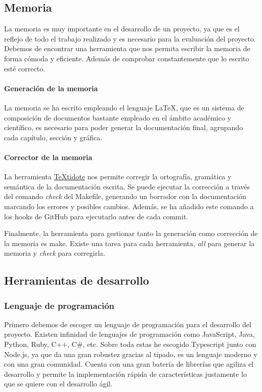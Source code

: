 \subsection{Memoria}
La memoria es muy importante en el desarrollo de un proyecto, ya que es el reflejo de todo el trabajo realizado y es necesario para la evaluación del proyecto.
Debemos de encontrar una herramienta que nos permita escribir la memoria de forma cómoda y eficiente. Además de comprobar constantemente que lo escrito esté correcto.

\paragraph*{Generación de la memoria}
La memoria se ha escrito empleando el lenguaje LaTeX, que es un sistema de composición de documentos bastante empleado
en el ámbito académico y científico, es necesario para poder generar la documentación final, agrupando cada capítulo, sección y
gráfica.

\paragraph*{Corrector de la memoria}
La herramienta \href{https://github.com/sylvainhalle/textidote}{TeXtidote} nos permite corregir la ortografía, gramática y semántica de la documentación escrita. Se puede ejecutar la corrección a través del comando \textit{check} del Makefile,
generando un borrador con la documentación marcando los errores y posibles cambios. Además, se ha añadido este comando a los hooks de GitHub para ejecutarlo antes de cada commit.

Finalmente, la herramienta para gestionar tanto la generación como corrección de la memoria es make. Existe una tarea para cada herramienta, \textit{all} para generar la memoria y \textit{check} para corregirla.

\subsection{Herramientas de desarrollo}

\subsubsection*{Lenguaje de programación}
Primero debemos de escoger un lenguaje de programación para el desarrollo del proyecto.
Existen infinidad de lenguajes de programación como JavaScript, Java, Python, Ruby, C++, C\#, etc.
Sobre toda estas he escogido Typescript junto con Node.js, ya que da una gran robustez gracias al tipado, es un lenguaje moderno y con una gran comunidad.
Cuenta con una gran batería de librerías que agiliza el desarrollo y permite la implementación rápida de características justamente lo que se quiere con el
desarrollo ágil.


